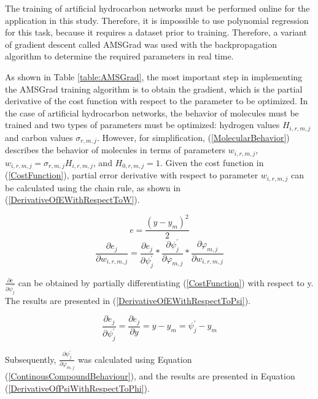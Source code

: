\documentclass{ieeeaccess}
\begin{document}
The training of artificial hydrocarbon networks must be performed online for the application in this study. Therefore, it is impossible to use polynomial regression for this task, because it requires a dataset prior to training. Therefore, a variant of gradient descent called AMSGrad was used with the backpropagation algorithm to determine the required parameters in real time.

As shown in Table \ref{table:AMSGrad}, the most important step in implementing the AMSGrad training algorithm is to obtain the gradient, which is the partial derivative of the cost function with respect to the parameter to be optimized. In the case of artificial hydrocarbon networks, the behavior of molecules must be trained and two types of parameters must be optimized: hydrogen values \(H_{i,r,m,j}\) and carbon values \(\sigma_{r,m,j}\). However, for simplification, (\ref{MolecularBehavior}) describes the behavior of molecules in terms of parameters \(w_{i,r,m,j}\), \(w_{i,r,m,j}=\sigma_{r,m,j}H_{i,r,m,j}\), and \(H_{0,r,m,j}=1\). Given the cost function in (\ref{CostFunction})\cite{isasi_vinuela_redes_2004}, partial error derivative with respect to parameter \(w_{i,r,m,j}\) can be calculated using the chain rule, as shown in (\ref{DerivativeOfEWithRespectToW}).

\begin{equation}\label{CostFunction}
 e=\frac{\left(y-y_m\right)^2}{2}
\end{equation}
\begin{equation}\label{DerivativeOfEWithRespectToW}
\frac{\partial e_j}{\partial w_{i,r,m,j}}=\frac{\partial e_j}{\partial\psi_j^\prime}\ast\frac{\partial\psi_j^\prime}{\partial\varphi_{m,j}}\ast\frac{\partial\varphi_{m,j}}{\partial w_{i,r,m,j}}
\end{equation}

\(\frac{\partial e}{\partial\psi_j^\prime}\) can be obtained by partially differentiating (\ref{CostFunction}) with respect to y. The results are presented in (\ref{DerivativeOfEWithRespectToPsi}).

\begin{equation}\label{DerivativeOfEWithRespectToPsi}
\frac{\partial e_j}{\partial\psi_j^\prime}=\frac{\partial e_j}{\partial y}=y-y_m=\psi_j^\prime-y_m
\end{equation}

Subsequently, \(\frac{\partial\psi_j^\prime}{\partial\varphi_{m,j}}\) was calculated using Equation (\ref{ContinousCompoundBehaviour}), and the results are presented in Equation (\ref{DerivativeOfPsiWithRespectToPhi}).
\end{document}

